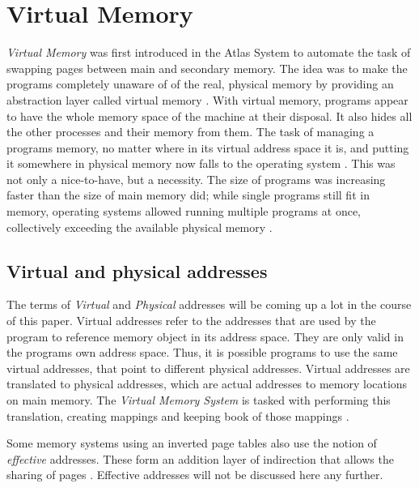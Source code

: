 \section{Virtual Memory}
\textit{Virtual Memory} was first introduced in the Atlas System \cite{fotheringham1961dynamic} to
automate the task of swapping pages between main and secondary memory.
The idea was to make the programs completely unaware of of the real, physical memory by providing
an abstraction layer called virtual memory \cite{denning1996virtual}.
With virtual memory, programs appear to have the whole memory space of the machine at their disposal. It also
hides all the other processes and their memory from them.
The task of managing a programs memory, no matter where in its virtual address space it is, and putting it somewhere
in physical memory now falls to the operating system \cite{denning1970virtual}.
This was not only a nice-to-have, but a necessity. The size of programs was increasing faster than the size of main
memory did; while single programs
still fit in memory, operating systems allowed running multiple programs at once, collectively exceeding
the available physical memory \cite{tanenbaumOS}.

\subsection{Virtual and physical addresses}
The terms of \textit{Virtual} and \textit{Physical} addresses will be coming up a lot in the course of this paper.
Virtual addresses refer to the addresses that are used by the program to reference memory object in its address
space. They are only valid in the programs own address space. Thus, it is possible programs to use the same
virtual addresses, that point to different physical addresses.
Virtual addresses are translated to physical addresses, which are actual addresses to memory locations
on main memory. The \textit{Virtual Memory System} is tasked with performing this translation, creating mappings
and keeping book of those mappings \cite{denning1996virtual}.

Some memory systems using an inverted page tables also use the notion of \textit{effective} addresses.
These form an addition layer of indirection that allows the sharing of pages \cite{jacob1998virtualissues}.
Effective addresses will not be discussed here any further.

